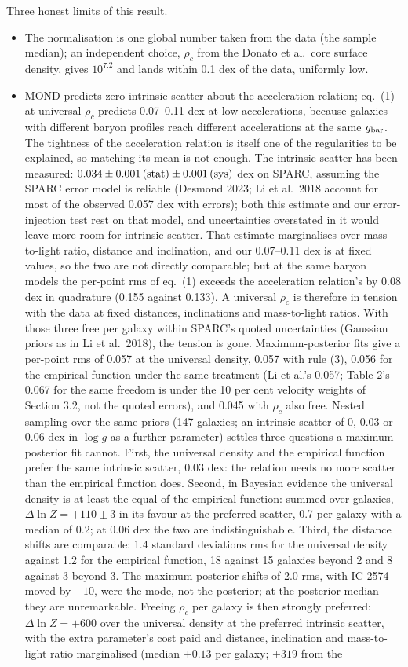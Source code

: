 \documentclass[
  10pt,
]{article}
\begin{document}
Three honest limits of this result.
\begin{itemize}
\item[(i)] The normalisation is one global number taken from the data (the sample median); an independent choice, $\rho_c$ from the Donato et al.~core surface density, gives $10^{7.2}$ and lands within 0.1 dex of the data, uniformly low.
\item[(ii)] MOND predicts zero intrinsic scatter about the acceleration relation; eq.~(1) at universal $\rho_c$ predicts 0.07--0.11 dex at low accelerations, because galaxies with different baryon profiles reach different accelerations at the same $g_{\rm bar}$. The tightness of the acceleration relation is itself one of the regularities to be explained, so matching its mean is not enough. The intrinsic scatter has been measured: $0.034\pm0.001\,{\rm(stat)}\pm0.001\,{\rm(sys)}$ dex on SPARC, assuming the SPARC error model is reliable (Desmond 2023; Li et al.~2018 account for most of the observed 0.057 dex with errors); both this estimate and our error-injection test rest on that model, and uncertainties overstated in it would leave more room for intrinsic scatter. That estimate marginalises over mass-to-light ratio, distance and inclination, and our 0.07--0.11 dex is at fixed values, so the two are not directly comparable; but at the same baryon models the per-point rms of eq.~(1) exceeds the acceleration relation's by 0.08 dex in quadrature (0.155 against 0.133). A universal $\rho_c$ is therefore in tension with the data at fixed distances, inclinations and mass-to-light ratios. With those three free per galaxy within SPARC's quoted uncertainties (Gaussian priors as in Li et al.~2018), the tension is gone. Maximum-posterior fits give a per-point rms of 0.057 at the universal density, 0.057 with rule (3), 0.056 for the empirical function under the same treatment (Li et al.'s 0.057; Table 2's 0.067 for the same freedom is under the 10 per cent velocity weights of Section 3.2, not the quoted errors), and 0.045 with $\rho_c$ also free. Nested sampling over the same priors (147 galaxies; an intrinsic scatter of 0, 0.03 or 0.06 dex in $\log g$ as a further parameter) settles three questions a maximum-posterior fit cannot. First, the universal density and the empirical function prefer the same intrinsic scatter, 0.03 dex: the relation needs no more scatter than the empirical function does. Second, in Bayesian evidence the universal density is at least the equal of the empirical function: summed over galaxies, $\Delta\ln Z=+110\pm3$ in its favour at the preferred scatter, 0.7 per galaxy with a median of 0.2; at 0.06 dex the two are indistinguishable. Third, the distance shifts are comparable: 1.4 standard deviations rms for the universal density against 1.2 for the empirical function, 18 against 15 galaxies beyond 2 and 8 against 3 beyond 3. The maximum-posterior shifts of 2.0 rms, with IC 2574 moved by $-10$, were the mode, not the posterior; at the posterior median they are unremarkable. Freeing $\rho_c$ per galaxy is then strongly preferred: $\Delta\ln Z=+600$ over the universal density at the preferred intrinsic scatter, with the extra parameter's cost paid and distance, inclination and mass-to-light ratio marginalised (median $+0.13$ per galaxy; $+319$ from the 
\end{itemize}
\end{document}
